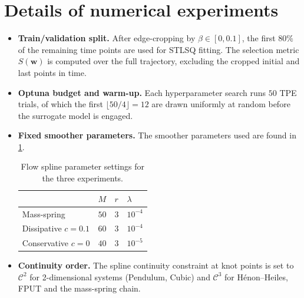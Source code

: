 \documentclass[11pt, a4paper]{article}
\theoremstyle{plain}
\theoremstyle{definition}
\theoremstyle{remark}
\begin{document}
\section{Details of numerical experiments}\label{sec:details_num}

\begin{itemize}

  \item \textbf{Train/validation split.}
    After edge-cropping by $\beta \in [0,0.1]$, the first $80\%$ of the remaining time points are used for STLSQ fitting. The selection metric $S(\mathbf{w})$ is computed over the full trajectory, excluding the cropped initial and last points in time.

  \item \textbf{Optuna budget and warm-up.}
    Each hyperparameter search runs $50$ TPE trials, of which the first $\lfloor 50/4 \rfloor = 12$ are drawn uniformly at random before the surrogate model is engaged.

  \item \textbf{Fixed smoother parameters.}
    The smoother parameters used are found in \cref{tab:smoother_params}.
    
    \begin{table}[h!]
    \caption{Flow spline parameter settings for the three experiments.}
\label{tab:smoother_params}
\renewcommand{\arraystretch}{1.3}
\centering
\begin{tabular}{llll}
\hline
 & $M$ & $r$ & $\lambda$ \\
\hline
Mass-spring & $50$ & $3$ & $10^{-4}$ \\
Dissipative $c=0.1$ & $60$ & $3$ & $10^{-4}$ \\
Conservative $c=0$ & $40$ & $3$ & $10^{-5}$ \\
\hline
\end{tabular}
\end{table}

  \item \textbf{Continuity order.}
    The spline continuity constraint at knot points is set to $\mathcal{C}^2$
    for 2-dimensional systems (Pendulum, Cubic) and $\mathcal{C}^3$ for Hénon--Heiles, FPUT and the mass-spring chain.


\end{itemize}
\end{document}
